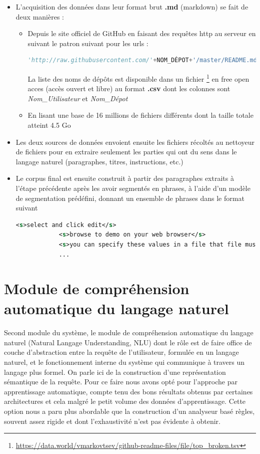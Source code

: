 		\begin{itemize}
			\item L'acquisition des données dans leur format brut \textbf{.md} (markdown) se fait de deux manières :
			\begin{itemize}
				\item Depuis le site officiel de GitHub en faisant des requêtes http au serveur en suivant le patron suivant pour les urls : 
				\begin{lstlisting}[language=python]
				'http://raw.githubusercontent.com/'+NOM_DÉPOT+'/master/README.md'\end{lstlisting}
				La liste des noms de dépôts est disponible dans un fichier \footnote{\url{https://data.world/vmarkovtsev/github-readme-files/file/top_broken.tsv}} en free open acces (accès ouvert et libre) au format \textbf{.csv} dont les colonnes sont \textit{Nom\_Utilisateur} et \textit{Nom\_Dépot} 
				\item En lisant une base de 16 millions de fichiers différents dont la taille totale atteint 4.5 Go  
			\end{itemize}
			\item Les deux sources de données envoient ensuite les fichiers récoltés au nettoyeur de fichiers pour en extraire seulement les parties qui ont du sens dans le langage naturel (paragraphes, titres, instructions, etc.)
			\item Le corpus final est ensuite construit à partir des paragraphes extraits à l'étape précédente après les avoir segmentés en phrases, à l'aide d'un modèle de segmentation prédéfini, donnant un ensemble de phrases dans le format suivant \begin{lstlisting}[language=xml]
			<s>select and click edit</s>
			<s>browse to demo on your web browser</s>
			<s>you can specify these values in a file that file must be home</s>
			...\end{lstlisting}
		\end{itemize}
	

\section{Module de compréhension automatique du langage naturel}
\paragraph{}
Second module du système, le module de compréhension automatique du langage naturel (Natural Langage Understanding, NLU) dont le rôle est de faire office de couche d'abstraction entre la requête de l'utilisateur, formulée en un langage naturel, et le fonctionnement interne du système qui communique à travers un langage plus formel. On parle ici de la construction d'une représentation sémantique de la requête. Pour ce faire nous avons opté pour l'approche par apprentissage automatique, compte tenu des bons résultats obtenus par certaines architectures \citep{intent_slots,intent_classification} et cela malgré le petit volume des données d'apprentissage. Cette option nous a paru plus abordable que la construction d'un analyseur basé règles, souvent assez rigide et dont l'exhaustivité n'est pas évidente à obtenir.
\newpage
